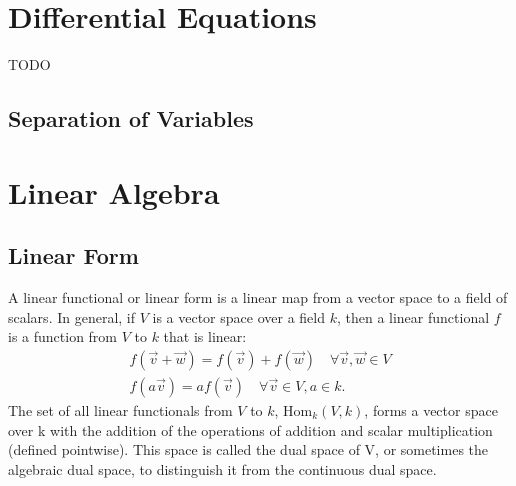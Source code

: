 \documentclass{article}
\numberwithin{theorem}{subsection}
\numberwithin{theorem}{subsubsection}
\numberwithin{lemma}{subsection}
\numberwithin{lemma}{subsubsection}
\theoremstyle{definition}
\numberwithin{definition}{subsection}
\numberwithin{definition}{subsubsection}
\begin{document}
\section{Differential Equations}

TODO 
\subsection{Separation of Variables}

\begin{comment}
=================================================================================================================================================================================================================================================================== LINEAR ALGEBRA ================================================= ====================================================================================================================================================================================================================================
\end{comment}

\section{Linear Algebra}
\subsection{Linear Form}
A linear functional or linear form is a linear map from a vector space to a field of scalars. In general, if $V$ is a vector space over a field $k$, then a linear functional $f$ is a function from $V$ to $k$ that is linear:
\begin{gather}
    f(\vec{v}+\vec{w}) = f(\vec{v})+f(\vec{w})\quad \forall \vec{v}, \vec{w}\in V\\
    f(a\vec{v}) = af(\vec{v})\quad \forall \vec{v}\in V, a\in k.
\end{gather}
The set of all linear functionals from $V$ to $k$, Hom$_{k}(V,k)$, forms a vector space over k with the addition of the operations of addition and scalar multiplication (defined pointwise).  This space is called the dual space of V, or sometimes the algebraic dual space, to distinguish it from the continuous dual space.


\begin{comment}
======================================================================================================================================================================================================================================================================================VECTOR CALCULUS=================================================== ====================================================================================================================================================================================================================================
\end{comment}
\end{document}
